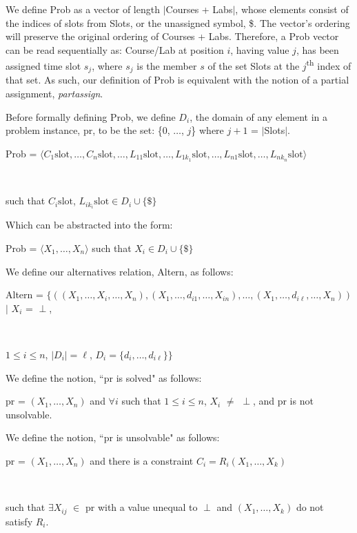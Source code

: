 \documentclass[11pt, oneside]{article}   	%
\begin{document}
\noindent We define Prob as a vector of length $\vert$Courses + Labs$\vert$, whose elements consist of the indices of slots from Slots, or the unassigned symbol, \$. The vector's ordering will preserve the original ordering of Courses + Labs. Therefore, a Prob vector can be read sequentially as: Course/Lab at position $i$, having value $j$, has been assigned time slot $s_j$, where $s_j$ is the member $s$ of the set Slots at the $j$\textsuperscript{th} index of that set. As such, our definition of Prob is equivalent with the notion of a partial assignment, \textit{partassign}.

\noindent Before formally defining Prob, we define $D_i$, the domain of any element in a problem instance, pr, to be the set: \{0, $\dots$, $j$\} where $j+1$ = $\vert$Slots$\vert$.

\noindent \centerline{Prob =  $\langle C_1 \text{slot}, \dots, C_n \text{slot}, \dots, L_{11} \text{slot}, \dots, L_{1{k_1}} \text{slot}, \dots, L_{n1} \text{slot}, \dots, L_{n{k_n}} \text{slot}\rangle$}\\
\centerline{such that $C_i \text{slot}$, $L_{i{k_i}} \text{slot} \in D_i \cup \{\$\}$}

\noindent Which can be abstracted into the form:

\noindent \centerline{Prob = $\langle X_1, \dots, X_n\rangle$ such that $X_i \in D_i \cup \{\$\}$}

\noindent We define our alternatives relation, Altern, as follows:

\noindent \centerline{Altern = $\{((X_1, \dots, X_i, \dots, X_n), (X_1, \dots, d_{i1}, \dots, X_{in}), \dots, (X_1, \dots, d_{i\ell}, \dots, X_n))$ $\vert$ $X_i$ = $\perp$,}\\
\centerline{$1 \le i \le n$, $\vert D_i \vert = \ell$, $D_i = \{d_i, \dots, d_{i\ell}\}\}$}

\noindent We define the notion, ``pr is solved" as follows:

\noindent \centerline{pr = $(X_1, \dots, X_n)$ and $\forall i$ such that $1 \le i \le n$, $X_i$ $\neq$ $\perp$, and pr is not unsolvable.}

\noindent We define the notion, ``pr is unsolvable" as follows:

\noindent \centerline{pr = $(X_1, \dots, X_n)$ and there is a constraint $C_i = R_i(X_1, \dots, X_k)$}\\
\centerline{such that $\exists X_{ij}$ $\in$ pr with a value unequal to $\perp$ and $(X_1, \dots, X_k)$ do not satisfy $R_i$.}
\end{document}
